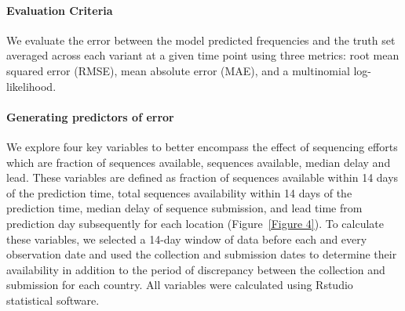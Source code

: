\documentclass[11pt,oneside,letterpaper]{article}
\begin{document}
\paragraph{Evaluation Criteria}

We evaluate the error between the model predicted frequencies and the truth set averaged across each variant at a given time point using three metrics: root mean squared error (RMSE), mean absolute error (MAE), and a multinomial log-likelihood.

\paragraph{Generating predictors of error}

We explore four key variables to better encompass the effect of sequencing efforts which are fraction of sequences available, sequences available, median delay and lead. 
These variables are defined as fraction of sequences available within 14 days of the prediction time, total sequences availability within 14 days of the prediction time, median delay of sequence submission, and lead time from prediction day subsequently for each location (Figure~\ref{Figure 4}).
To calculate these variables, we selected a 14-day window of data before each and every observation date and used the collection and submission dates to determine their availability in addition to the period of discrepancy between the collection and submission for each country.
All variables were calculated using Rstudio statistical software.
\end{document}
